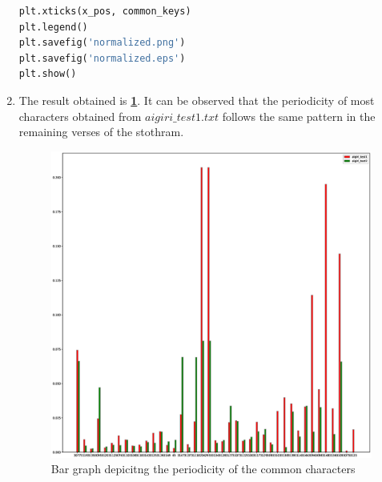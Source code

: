 \begin{enumerate}[label=\thesection.\arabic*.,ref=\thesection.\theenumi]
\begin{lstlisting}[language=Python]
plt.xticks(x_pos, common_keys)
plt.legend()
plt.savefig('normalized.png')
plt.savefig('normalized.eps')
plt.show() 
\end{lstlisting}

\newpage
\item The result obtained is \textbf{\ref{fig:bar}}. It can be observed that the periodicity of most characters obtained from $aigiri\_test1.txt$ follows the same pattern in the remaining verses of the stothram. 
\begin{figure}[!t]
\centering
\includegraphics[width=\columnwidth]{./figs/normalized.eps}
\caption{Bar graph depicitng the periodicity of the common characters}
\label{fig:bar}
\end{figure} 

\end{enumerate}
